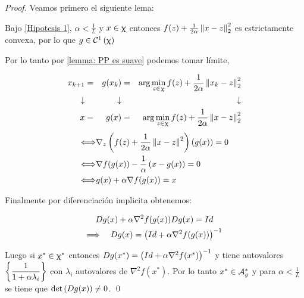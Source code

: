 \begin{proof}
	Veamos primero el siguiente lema:
	
	
	\begin{lemma}
		\label{lemma: PP es suave}
		Bajo \ref{Hipotesis 1}, $\alpha < \frac{1}{L}$ y $x \in \upchi$ entonces $f(z) + \frac{1}{2 \alpha} \left\lVert x- z\right\rVert_2^2$ es estrictamente convexa, por lo que $g \in \mathcal{C}^1 \left(\upchi\right)$
	\end{lemma}
	
	Por lo tanto por \ref{lemma: PP es suave} podemos tomar l\'imite, \ie
	
	\begin{equation*}
	\begin{aligned}
	x_{k+1} & = & g(x_k) & = & \arg \min\limits_{z \in \upchi}{f(z) + \dfrac{1}{2\alpha}\left\lVert x_k - z\right\rVert_{2}^{2}} \\
	\downarrow & & \downarrow & & \downarrow \\
	x & = & g(x) & = & \arg \min\limits_{z \in \upchi}{f(z) + \dfrac{1}{2\alpha}\left\lVert x - z\right\rVert_{2}^{2}}
	\end{aligned}
	\end{equation*}
	\begin{equation*}
	\begin{aligned}
	\Longleftrightarrow & \nabla_z \left(f(z) + \frac{1}{2 \alpha} \left\lVert x-z\right\rVert^2\right)(g(x)) = 0 \\
	\Longleftrightarrow & \nabla f(g(x)) - \frac{1}{\alpha} \left(x-g(x)\right) = 0 \\
	\Longleftrightarrow & g(x) + \alpha \nabla f(g(x)) = x
	\end{aligned}
	\end{equation*}
	
	Finalmente por diferenciaci\'on implicita obtenemos:
	
	\begin{gather*}
		Dg(x) + \alpha\nabla^2 f (g(x))Dg(x) = Id \\
		\Longrightarrow \quad Dg(x) = \left(Id + \alpha \nabla^2 f(g(x))\right)^{-1}
	\end{gather*}

	Luego si $x^* \in \upchi^*$ entonces $Dg(x^*) = \left(Id + \alpha \nabla^2 f(x^*)\right)^{-1}$ y tiene autovalores $\left\lbrace\dfrac{1}{1+ \alpha \lambda_i}\right\rbrace$ con $\lambda_i$ autovalores de $\nabla^2 f(x^*)$. Por lo tanto $x^* \in \mathcal{A}_{g}^{*}$ y para $\alpha < \frac{1}{L}$ se tiene que $\det \left(Dg(x)\right) \neq 0$. \qed
	
\end{proof}

